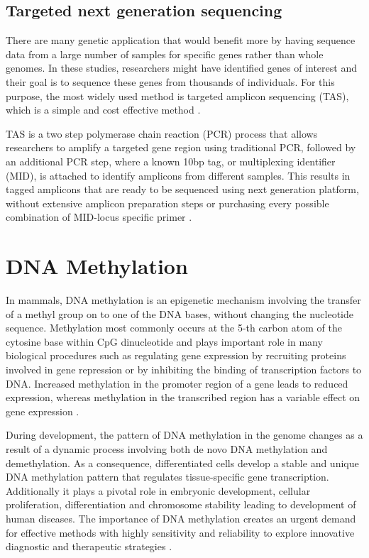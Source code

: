 \subsection{Targeted next generation sequencing}
\label{sec:background:NGS}
There are many genetic application that would benefit more by having sequence data from a large number of samples for specific genes rather than whole genomes. In these studies, researchers might have identified genes of interest and their goal is to sequence these genes from thousands of individuals. For this purpose, the most widely used method is targeted amplicon sequencing (TAS), which is a simple and cost effective method \cite{bybee2011targeted}.

TAS is a two step polymerase chain reaction (PCR) process that allows researchers to amplify a targeted gene region using traditional PCR, followed by an additional PCR step, where a known 10bp tag, or multiplexing identifier (MID), is attached to identify amplicons from different samples. This results in tagged amplicons that are ready to be sequenced using next generation platform, without extensive amplicon preparation steps or purchasing every possible combination of MID-locus specific primer \cite{bybee2011targeted}.

\section{DNA Methylation}
\label{sec:background:methylation}
In mammals, DNA methylation is an epigenetic mechanism involving the transfer of a methyl group on to one of the DNA bases, without changing the nucleotide sequence.
Methylation most commonly occurs at the 5-th carbon atom of the cytosine base within CpG dinucleotide and plays important role in many biological procedures such as regulating gene expression by recruiting proteins involved in gene repression or by inhibiting the binding of transcription factors to DNA. Increased methylation in the promoter region of a gene leads to reduced expression, whereas methylation in the transcribed region has a variable effect on gene expression \cite{das2004dna}. 

During development, the pattern of DNA methylation in the genome changes as a result of a dynamic process involving both de novo DNA methylation and demethylation. As a consequence, differentiated cells develop a stable and unique DNA methylation pattern that regulates tissue-specific gene transcription. 
Additionally it plays a pivotal role in embryonic development, cellular proliferation, differentiation and chromosome stability leading to development of human diseases. The importance of DNA methylation creates an urgent demand for effective methods with highly sensitivity and reliability to explore innovative diagnostic and therapeutic strategies \cite{li2011dna}.


